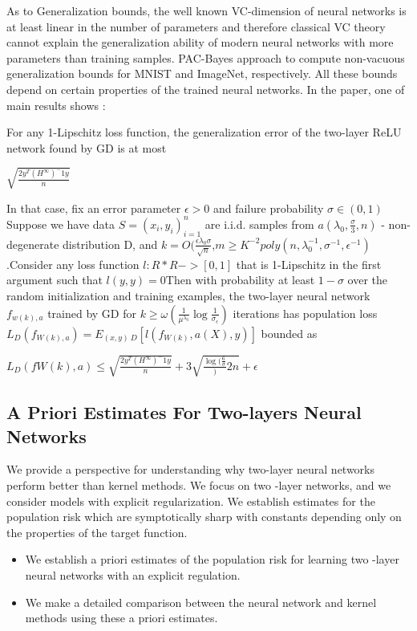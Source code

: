 \documentclass{article}
\begin{document}
As to Generalization bounds, the well known VC-dimension of neural networks is at least linear in the number of parameters and therefore classical VC theory cannot explain the generalization ability of modern neural networks with more parameters than training samples. PAC-Bayes approach to compute non-vacuous generalization bounds for MNIST and ImageNet, respectively. All these bounds depend on certain properties of the trained neural networks. In the paper, one of main results shows :

For any 1-Lipschitz loss function, the generalization error of the two-layer ReLU network found by GD is at most 
\begin{center}
  $\sqrt{\frac{2y^T(H^\infty)^-1y}{n}}$
\end{center}
In that case, fix an error parameter $\epsilon > 0$ and failure probability $\sigma \in (0,1)$ Suppose we have data $S={(x_i,y_i)}_{i=1}^n$ are i.i.d. samples from $a (\lambda_0,\frac{\sigma}{3},n)$ - non-degenerate distribution D, and $k = O(\frac{\epsilon\lambda_0\sigma}{\sqrt{n}}$,$m \geq K^{-2}poly(n,\lambda_0^{-1},\sigma^{-1},\epsilon^{-1})$.Consider any loss function $l:R*R ->[0,1]$ that is 1-Lipschitz in the first argument such that $l(y,y)=0 $Then with probability at least $1-\sigma$ over the random initialization and training examples, the two-layer neural network $f_{w(k),a}$ trained by GD for $k\geq\omega(\frac{1}{\mu^{\lambda_0}}\log{\frac{1}{\sigma_\epsilon}})$ iterations has population loss $L_D(f_{W(k),a})= E_{(x,y)~D}[l(f_{W(k)},a(X),y)]$ bounded as
\begin{center}
    $L_D(f{W(k),a})\leq \sqrt{\frac{2y^T(H^\infty)^-1y}{n}} +3\sqrt{\frac{\log(\frac{6}{\sigma}}){2n}}+\epsilon$
\end{center}
\subsection{A Priori Estimates For Two-layers Neural Networks}
We provide a perspective for understanding why two-layer neural networks perform better than kernel methods. We focus on two -layer networks, and we consider models with explicit regularization. We establish estimates for the population risk which are symptotically sharp with constants depending only on the properties of the target function. 
\begin{itemize}
\item We establish a priori estimates of the population risk for learning two -layer neural networks with an explicit regulation. 
\item We make a detailed comparison between the neural network and kernel methods using these a priori estimates. 
\end{itemize}
\end{document}
